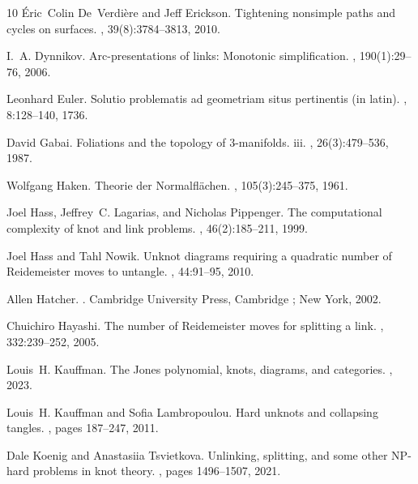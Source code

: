 \documentclass[10pt,a4paper]{amsart}
\begin{document}
\begin{thebibliography}{10}
{\'E}ric~Colin De~Verdi{\`e}re and Jeff Erickson.
\newblock Tightening nonsimple paths and cycles on surfaces.
, 39(8):3784--3813, 2010.

I.~A. Dynnikov.
\newblock Arc-presentations of links: Monotonic simplification.
, 190(1):29--76, 2006.

Leonhard Euler.
\newblock Solutio problematis ad geometriam situs pertinentis (in latin).
,
  8:128--140, 1736.

David Gabai.
\newblock Foliations and the topology of 3-manifolds. iii.
, 26(3):479--536, 1987.

Wolfgang Haken.
\newblock Theorie der {N}ormalfl{\"a}chen.
, 105(3):245--375, 1961.

Joel Hass, Jeffrey~C. Lagarias, and Nicholas Pippenger.
\newblock The computational complexity of knot and link problems.
, 46(2):185--211, 1999.

Joel Hass and Tahl Nowik.
\newblock Unknot diagrams requiring a quadratic number of {R}eidemeister moves
  to untangle.
, 44:91--95, 2010.

Allen Hatcher.
.
\newblock Cambridge University Press, Cambridge ; New York, 2002.

Chuichiro Hayashi.
\newblock The number of {R}eidemeister moves for splitting a link.
, 332:239--252, 2005.

Louis~H. Kauffman.
\newblock The {J}ones polynomial, knots, diagrams, and categories.
, 2023.

Louis~H. Kauffman and Sofia Lambropoulou.
\newblock Hard unknots and collapsing tangles.
, pages 187--247, 2011.

Dale Koenig and Anastasiia Tsvietkova.
\newblock Unlinking, splitting, and some other {NP}-hard problems in knot
  theory.
, pages 1496--1507, 2021.


\end{thebibliography}
\end{document}
